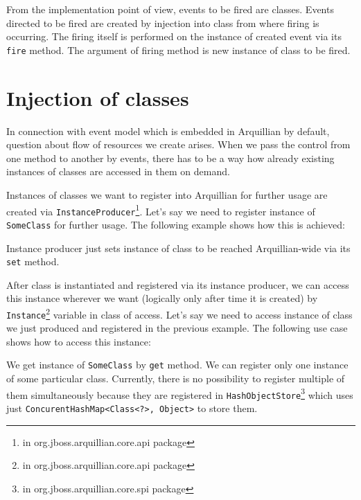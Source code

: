\documentclass[12pt,final,oneside]{fithesis}
\begin{document}
From the implementation point of view, events to be fired are classes. Events directed to be fired are created by injection into class from where firing is occurring. The firing itself is performed on the instance of created event via its \texttt{fire} method. The argument of firing method is new instance of class to be fired.


	
	\section{Injection of classes}

In connection with event model which is embedded in Arquillian by default, question about flow of resources we create arises. When we pass the control from one method to another by events, there has to be a way how already existing instances of classes are accessed in them on demand.

Instances of classes we want to register into Arquillian for further usage are created via \texttt{InstanceProducer}\footnote{in org.jboss.arquillian.core.api package}. Let's say we need to register instance of \texttt{SomeClass} for further usage. The following example shows how this is achieved:

	
	
Instance producer just sets instance of class to be reached Arquillian-wide via its \texttt{set} method.

After class is instantiated and registered via its instance producer, we can access this instance wherever we want (logically only after time it is created) by \texttt{Instance}\footnote{in org.jboss.arquillian.core.api package} variable in class of access. Let's say we need to access instance of class we just produced and registered in the previous example. The following use case shows how to access this instance:

	

We get instance of \texttt{SomeClass} by \texttt{get} method. We can register only one instance of some particular class. Currently, there is no possibility to register multiple of them simultaneously because they are registered in \texttt{HashObjectStore}\footnote{in org.jboss.arquillian.core.spi package} which uses just \texttt{ConcurentHashMap<Class<?>, Object>} to store them.
\end{document}
